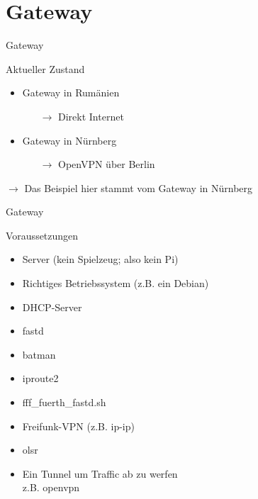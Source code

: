 \section{Gateway}


\begin{frame}{Gateway}
    \begin{block}{Aktueller Zustand}
        \begin{itemize}
            \item Gateway in Rumänien
            \begin{itemize}
                \item[$\rightarrow$] Direkt Internet
            \end{itemize}
            \item Gateway in Nürnberg
            \begin{itemize}
                \item[$\rightarrow$] OpenVPN über Berlin
            \end{itemize}
        \end{itemize}
    \end{block}

    $\longrightarrow$ Das Beispiel hier stammt vom Gateway in Nürnberg
\end{frame}


\begin{frame}{Gateway}
    \begin{block}{Voraussetzungen}
        \begin{itemize}
            \item Server (kein Spielzeug; also kein Pi)
            \item Richtiges Betriebssystem (z.B. ein Debian)
            \item DHCP-Server
            \item fastd
            \item batman
            \item iproute2
            \item fff\_fuerth\_fastd.sh
            \item Freifunk-VPN (z.B. ip-ip)
            \item olsr
            \item Ein Tunnel um Traffic ab zu werfen\\
                z.B. openvpn
        \end{itemize}
    \end{block}
\end{frame}

